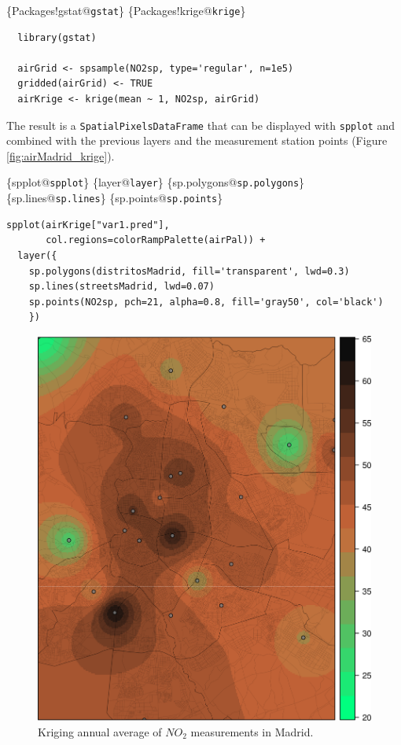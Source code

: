\begin{LaTeX}
\index\{Packages!gstat@\texttt{gstat}\}
\index\{Packages!krige@\texttt{krige}\}
\end{LaTeX}

\lstset{language=r,label= ,caption= ,captionpos=b,numbers=none}
\begin{lstlisting}
  library(gstat)
  
  airGrid <- spsample(NO2sp, type='regular', n=1e5)
  gridded(airGrid) <- TRUE
  airKrige <- krige(mean ~ 1, NO2sp, airGrid)
\end{lstlisting}

The result is a \texttt{SpatialPixelsDataFrame} that can be displayed with
\texttt{spplot} and combined with the previous layers and the measurement
station points (Figure \ref{fig:airMadrid_krige}).

\begin{LaTeX}
\index\{spplot@\texttt{spplot}\}
\index\{layer@\texttt{layer}\}
\index\{sp.polygons@\texttt{sp.polygons}\}
\index\{sp.lines@\texttt{sp.lines}\}
\index\{sp.points@\texttt{sp.points}\}
\end{LaTeX}

\lstset{language=r,label= ,caption= ,captionpos=b,numbers=none}
\begin{lstlisting}
spplot(airKrige["var1.pred"],
       col.regions=colorRampPalette(airPal)) +
  layer({
    sp.polygons(distritosMadrid, fill='transparent', lwd=0.3)
    sp.lines(streetsMadrid, lwd=0.07)
    sp.points(NO2sp, pch=21, alpha=0.8, fill='gray50', col='black')
    })
\end{lstlisting}

\begin{figure}[htbp]
\centering
\includegraphics[width=.9\linewidth]{figs/airMadrid_krige.png}
\caption{\label{fig:orgd4e47f0}
Kriging annual average of \(NO_2\) measurements in Madrid.}
\end{figure}

